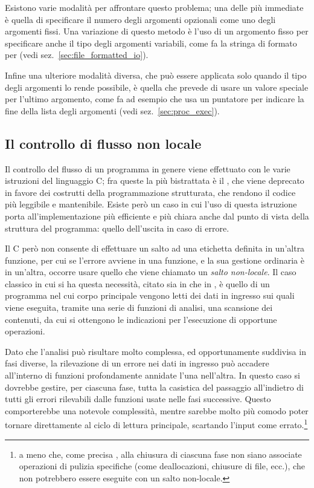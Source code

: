 Esistono varie modalità per affrontare questo problema; una delle più
immediate è quella di specificare il numero degli argomenti opzionali come uno
degli argomenti fissi. Una variazione di questo metodo è l'uso di un argomento
fisso per specificare anche il tipo degli argomenti variabili, come fa la
stringa di formato per  (vedi sez.~\ref{sec:file_formatted_io}).

Infine una ulteriore modalità diversa, che può essere applicata solo quando il
tipo degli argomenti lo rende possibile, è quella che prevede di usare un
valore speciale per l'ultimo argomento, come fa ad esempio  che
usa un puntatore  per indicare la fine della lista degli argomenti
(vedi sez.~\ref{sec:proc_exec}).


\subsection{Il controllo di flusso non locale}
\label{sec:proc_longjmp}

Il controllo del flusso di un programma in genere viene effettuato con le
varie istruzioni del linguaggio C; fra queste la più bistrattata è il
, che viene deprecato in favore dei costrutti della
programmazione strutturata, che rendono il codice più leggibile e
mantenibile. Esiste però un caso in cui l'uso di questa istruzione porta
all'implementazione più efficiente e più chiara anche dal punto di vista della
struttura del programma: quello dell'uscita in caso di errore.


Il C però non consente di effettuare un salto ad una etichetta definita in
un'altra funzione, per cui se l'errore avviene in una funzione, e la sua
gestione ordinaria è in un'altra, occorre usare quello che viene chiamato un
\textsl{salto non-locale}.  Il caso classico in cui si ha questa necessità,
citato sia in \cite{APUE} che in \cite{GlibcMan}, è quello di un programma nel
cui corpo principale vengono letti dei dati in ingresso sui quali viene
eseguita, tramite una serie di funzioni di analisi, una scansione dei
contenuti, da cui si ottengono le indicazioni per l'esecuzione di opportune
operazioni.

Dato che l'analisi può risultare molto complessa, ed opportunamente suddivisa
in fasi diverse, la rilevazione di un errore nei dati in ingresso può accadere
all'interno di funzioni profondamente annidate l'una nell'altra. In questo
caso si dovrebbe gestire, per ciascuna fase, tutta la casistica del passaggio
all'indietro di tutti gli errori rilevabili dalle funzioni usate nelle fasi
successive.  Questo comporterebbe una notevole complessità, mentre sarebbe
molto più comodo poter tornare direttamente al ciclo di lettura principale,
scartando l'input come errato.\footnote{a meno che, come precisa
  \cite{GlibcMan}, alla chiusura di ciascuna fase non siano associate
  operazioni di pulizia specifiche (come deallocazioni, chiusure di file,
  ecc.), che non potrebbero essere eseguite con un salto non-locale.}

